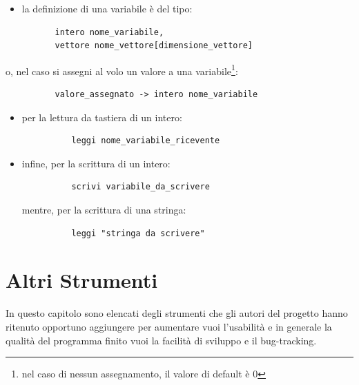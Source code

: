 \documentclass[11pt, a4paper, twoside, notitlepage]{report}
\begin{document}
\begin{itemize}
  \item la definizione di una variabile è del tipo:
\end{itemize}
\begin{verbatim}
          intero nome_variabile,
          vettore nome_vettore[dimensione_vettore]
\end{verbatim}
 o, nel caso si assegni al volo un valore a una variabile\footnote{nel caso di
 nessun assegnamento, il valore di default è 0}:
 
\begin{verbatim}
          valore_assegnato -> intero nome_variabile
\end{verbatim}

\begin{itemize}
 \item per la lettura da tastiera di un intero:
\begin{verbatim}
          leggi nome_variabile_ricevente
\end{verbatim}
\item infine, per la scrittura di un intero:
\begin{verbatim}
          scrivi variabile_da_scrivere
\end{verbatim}
mentre, per la scrittura di una stringa:
\begin{verbatim}
          leggi "stringa da scrivere"
\end{verbatim}
\end{itemize} 
\chapter{Altri Strumenti}
In questo capitolo sono elencati degli strumenti che gli autori del progetto
hanno ritenuto opportuno aggiungere per aumentare vuoi l'usabilità e in generale
la qualità del programma finito vuoi la facilità di sviluppo e il bug-tracking.
\end{document}
